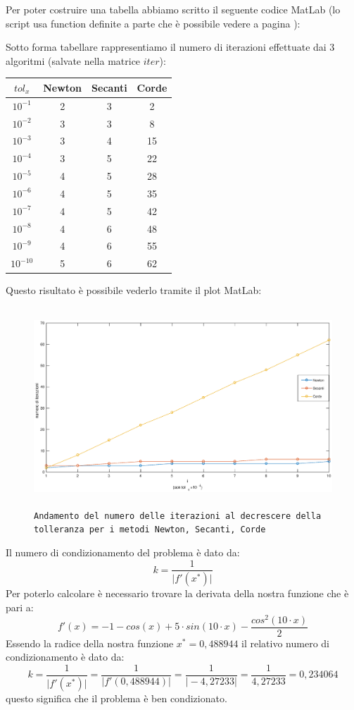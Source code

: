 \begin{flushleft}
Per poter costruire una tabella abbiamo scritto il seguente codice MatLab (lo script usa function definite a parte che è possibile vedere a pagina \pageref{functcap2}):

Sotto forma tabellare rappresentiamo il numero di iterazioni effettuate dai 3 algoritmi (salvate nella matrice $iter$):

\begin{center}
\begin{tabular}{|c|c|c|c|}
\hline
$tol_x$ & Newton & Secanti & Corde \\
\hline
$10^{-1}$ & 2 & 3 & 2 \\
$10^{-2}$ & 3 & 3 & 8 \\
$10^{-3}$ & 3 & 4 & 15 \\
$10^{-4}$ & 3 & 5 & 22 \\
$10^{-5}$ & 4 & 5 & 28 \\
$10^{-6}$ & 4 & 5 & 35 \\
$10^{-7}$ & 4 & 5 & 42 \\
$10^{-8}$ & 4 & 6 & 48 \\
$10^{-9}$ & 4 & 6 & 55 \\
$10^{-10}$ & 5 & 6 & 62 \\
\hline
\end{tabular}
\end{center}
Questo risultato è possibile vederlo tramite il plot MatLab:
\begin{figure}[H]
\label{fes26}
\includegraphics[width=480px, height=280px]{plot/fes26}
\caption{\texttt{\texttt{Andamento del numero delle iterazioni al decrescere della tolleranza per i metodi Newton, Secanti, Corde}}}
\end{figure}
Il numero di condizionamento del problema è dato da:
\[
k = \frac{1}{\big|f'(x^*)\big|}
\]
Per poterlo calcolare è necessario trovare la derivata della nostra funzione che è pari a:
\[
f'(x) = -1 - cos(x) + 5 \cdot sin(10\cdot x) - \frac{cos^2(10\cdot x)}{2}
\]
Essendo la radice della nostra funzione  $x^* = 0,488944$ il relativo numero di condizionamento è dato da:
\[
k = \frac{1}{\Big|f'(x^*)\Big|} = \frac{1}{\Big|f'(0,488944)\Big|} = \frac{1}{\Big|-4,27233\Big|} = \frac{1}{4,27233} = 0,234064
\]
questo significa che il problema è ben condizionato.
\end{flushleft}